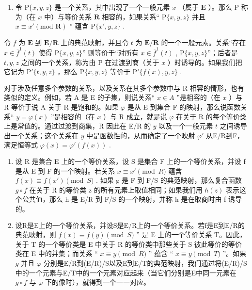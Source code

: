 \begin{enumerate}
\def\labelenumi{\arabic{enumi}.}
\setcounter{enumi}{6}
\tightlist
\item
  令 \(\mathrm{P}\{x, y, z\}\) 是一个关系，其中出现了一个一般元素 \(x\) （属于 \(\mathbf{E}\) ）。那么 \(\mathrm{P}\) 称为（在 \(x\) 中）与等价关系 \(\mathbf{R}\) 相容的，如果关系“ \(\mathrm{P}\{x, y, z\}\) 并且 \(x \equiv x' (\text{mod } \mathbf{R})\) '' 蕴含 \(\mathrm{P}\{x', y, z\}\) .
\end{enumerate}

令 \(f\) 为 \(\mathbf{E}\) 到 \(\mathbf{E} / \mathbf{R}\) 上的典范映射，并且令 \(t\) 为 \(\mathbf{E} / \mathbf{R}\) 的一个一般元素。关系“存在 \(x \in \overline{f}^1(t)\) 使得 \(\mathrm{P}\{x, y, z\}\)'' 则等价于“对所有 \(x \in \overline{f}^1(t)\) , \(\mathrm{P}\{x, y, z\}\)''；后者是 \(t, y, z\) 之间的一个关系，称为由 \(\mathrm{P}\) 在过渡到商（关于 \(x\) ）时诱导的。如果我们把它记为 \(\mathrm{P}'\{t, y, z\}\) ，那么 \(\mathrm{P}\{x, y, z\}\) 等价于 \(\mathrm{P}'\{f(x), y, z\}\) .

对于涉及任意多个参数的关系，以及关系在其多个参数中与 R 相容的情形，也有类似的定义。例如，若 A 是 E 的子集，则说关系“ \(x \in A\) ”是相容的（在 \(x\) ）与 R 等价于说 A 关于 R 是饱和的。如果 \(\varphi\) 是从 E 到集合 F 的映射，那么说函数关系“ \(y = \varphi(x)\) ”是相容的（在 \(x\) ）与 R 成立，就是说 \(\varphi\) 在关于 R 的每个等价类上是常值的。通过过渡到商集，R 因此在 E/R 的 \(y\) 以及一个一般元素 \(t\) 之间诱导出一个关系；这个关系在 \(y\) 中是函数性的，从而确定了一个映射 \(\varphi'\) 从E/R到F，满足恒等式 \(\varphi(x) = \varphi'(f(x))\) .

\begin{enumerate}
\def\labelenumi{\arabic{enumi}.}
\setcounter{enumi}{7}
\item
  设 R 是集合 E 上的一个等价关系，设 S 是集合 F 上的一个等价关系，并设 f 是从 E 到 F 的一个映射。若关系 \(x \equiv x' \pmod{R}\) 蕴含 \(f(x) \equiv f(x') \pmod{S}\) . 如果 g 是 F 到 F/S 的典范映射，那么复合函数 \(g \circ f\) 在关于 R 的等价类 z 的所有元素上取值相同；如果我们用 \(h(z)\) 表示这个公共值，那么 h 是 E/R 到 F/S 的一个映射，并称 h 是在取商时由 f 诱导的。
\item
  设R是E上的一个等价关系，并设S是E/R上的一个等价关系。若f是E到E/R的典范映射，则 \(f(x) \equiv f(y) \pmod{S}\) '' 是 E 上的一个等价关系 T。因此，关于 T 的一个等价类是 E 中关于 R 的等价类中那些关于 S 彼此等价的等价类在 E 中的并集；而关系 `` \(x \equiv y \pmod{R}\) '' 蕴含 `` \(x \equiv y \pmod{T}\) ''。如果 \(g\) 并且 \(\varphi\) 分别是E/R到(E/R)/S以及E到E/T的典范映射，我们通过将(E/R)/S中的一个元素与E/T中的一个元素对应起来（当它们分别是E中同一元素在 \(g \circ f\) 与 \(\varphi\) 下的像时），就得到一个一一对应。
\end{enumerate}

